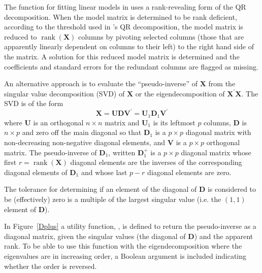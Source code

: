 \documentclass[shortnames,article]{jss}
\newcommand{\rank}{\operatorname{rank}}
\begin{document}
The  function for fitting linear models in  uses
a rank-revealing form of the QR decomposition.  When the model matrix
is determined to be rank deficient, according to the threshold used in
's QR decomposition, the model matrix is reduced to
$\rank{(\bm X)}$ columns by pivoting selected columns (those that are
apparently linearly dependent on columns to their left) to the right
hand side of the matrix.  A solution for this reduced model matrix is
determined and the coefficients and standard errors for the redundant
columns are flagged as missing.

An alternative approach is to evaluate the ``pseudo-inverse'' of $\bm
X$ from the singular value decomposition (SVD) of $\bm X$ or the
eigendecomposition of $\bm X^\prime\bm X$.  The SVD is of the form
\begin{displaymath}
  \bm X=\bm U\bm D\bm V^\prime=\bm U_1\bm D_1\bm V^\prime
\end{displaymath}
where $\bm U$ is an orthogonal $n\times n$ matrix and $\bm U_1$ is its
leftmost $p$ columns, $\bm D$ is $n\times p$ and zero off the main
diagonal so that $\bm D_1$ is a $p\times p$ diagonal matrix with
non-decreasing non-negative diagonal elements, and $\bm V$ is a $p\times
p$ orthogonal matrix.  The pseudo-inverse of $\bm D_1$, written $\bm
D_1^+$ is a $p\times p$ diagonal matrix whose first $r=\rank(\bm X)$
diagonal elements are the inverses of the corresponding diagonal
elements of $\bm D_1$ and whose last $p-r$ diagonal elements are zero.

The tolerance for determining if an element of the diagonal of $\bm D$
is considered to be (effectively) zero is a multiple of the largest
singular value (i.e. the $(1,1)$ element of $\bm D$).

In Figure~\ref{Dplus} a utility function, , is defined to
return the pseudo-inverse as a diagonal matrix, given the singular
values (the diagonal of $\bm D$) and the apparent rank.  To be able to
use this function with the eigendecomposition where the eigenvalues
are in increasing order, a Boolean argument  is included
indicating whether the order is reversed.
\end{document}
